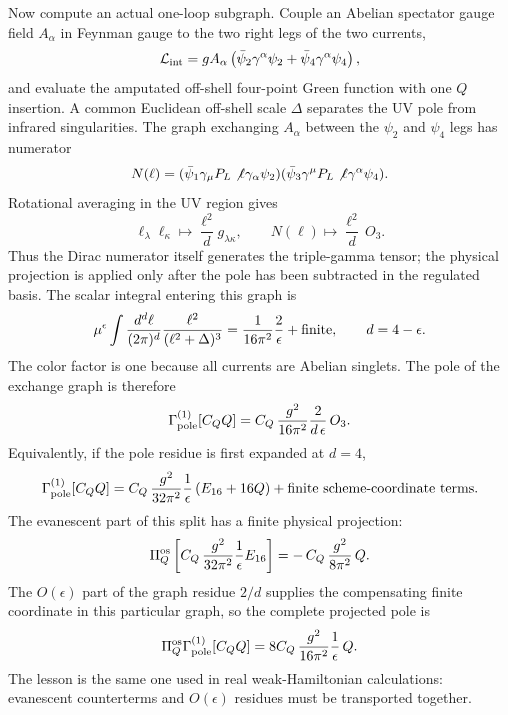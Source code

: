 Now compute an actual one-loop subgraph.  Couple an Abelian spectator gauge
field \(A_\alpha\) in Feynman gauge to the two right legs of the two currents,
\[
  \mathcal L_{\rm int}
  =
  g A_\alpha
  \left(\bar\psi_2\gamma^\alpha\psi_2
        +\bar\psi_4\gamma^\alpha\psi_4\right),
\]
and evaluate the amputated off-shell four-point Green function with one \(Q\)
insertion.  A common Euclidean off-shell scale \(\Delta\) separates the UV pole
from infrared singularities.  The graph exchanging \(A_\alpha\) between the
\(\psi_2\) and \(\psi_4\) legs has numerator
\[
  N(\ell)
  =
  (\bar\psi_1\gamma_\mu P_L\not\ell\gamma_\alpha\psi_2)
  (\bar\psi_3\gamma^\mu P_L\not\ell\gamma^\alpha\psi_4).
\]
Rotational averaging in the UV region gives
\[
  \ell_\lambda\ell_\kappa\mapsto
  \frac{\ell^2}{d}g_{\lambda\kappa},
  \qquad
  N(\ell)\mapsto\frac{\ell^2}{d}\,O_3 .
\]
Thus the Dirac numerator itself generates the triple-gamma tensor; the
physical projection is applied only after the pole has been subtracted in the
regulated basis.
The scalar integral entering this graph is
\begin{equation}
  \mu^\epsilon
  \int\frac{d^d\ell}{(2\pi)^d}
  \frac{\ell^2}{(\ell^2+\Delta)^3}
  =
  \frac{1}{16\pi^2}\frac{2}{\epsilon}
  +\hbox{finite},
  \qquad d=4-\epsilon .
  \label{eq:eft-evanescent-bubble-pole}
\end{equation}
The color factor is one because all currents are Abelian singlets.  The pole of
the exchange graph is therefore
\begin{equation}
  \Gamma_{\rm pole}^{(1)}[C_QQ]
  =
  C_Q\,\frac{g^2}{16\pi^2}\frac{2}{d\,\epsilon}\,O_3 .
  \label{eq:eft-evanescent-concrete-pole}
\end{equation}
Equivalently, if the pole residue is first expanded at \(d=4\),
\[
  \Gamma_{\rm pole}^{(1)}[C_QQ]
  =
  C_Q\,\frac{g^2}{32\pi^2}\frac{1}{\epsilon}
  \left(E_{16}+16Q\right)
  +
  \hbox{finite scheme-coordinate terms}.
\]
The evanescent part of this split has a finite physical projection:
\begin{equation}
  \Pi_Q^{\rm os}
  \left[
    C_Q\,\frac{g^2}{32\pi^2}\frac{1}{\epsilon}E_{16}
  \right]
  =
  -\,C_Q\,\frac{g^2}{8\pi^2}\,Q .
  \label{eq:eft-evanescent-finite-split-component}
\end{equation}
The \(O(\epsilon)\) part of the graph residue \(2/d\) supplies the compensating
finite coordinate in this particular graph, so the complete projected pole is
\[
  \Pi_Q^{\rm os}\Gamma_{\rm pole}^{(1)}[C_QQ]
  =
  8C_Q\,\frac{g^2}{16\pi^2}\frac{1}{\epsilon}\,Q .
\]
The lesson is the same one used in
real weak-Hamiltonian calculations: evanescent counterterms and
\(O(\epsilon)\) residues must be transported together.

